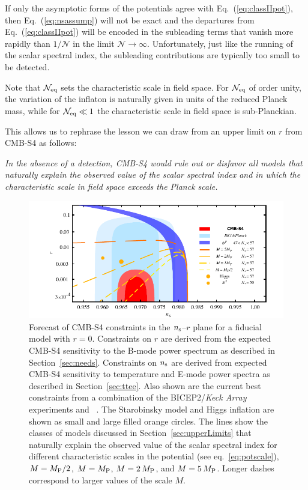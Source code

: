 If only the asymptotic forms of the potentials agree with Eq.~(\ref{eq:classIIpot}), then Eq.~(\ref{eq:nsassump}) will not be exact and the departures from Eq.~(\ref{eq:classIIpot}) will be encoded in the subleading terms that vanish more rapidly than $1/\mathcal{N}$ in the limit $\mathcal{N}\to\infty$. Unfortunately, just like the running of the scalar spectral index, the subleading contributions are typically too small to be detected.

Note that $\mathcal{N}_{\rm eq}$ sets the characteristic scale in field space. For $\mathcal{N}_{\rm eq}$ of order unity, the variation of the inflaton is naturally given in units of the reduced Planck mass, while for $\mathcal{N}_{\rm eq}\ll 1$ the characteristic scale in field space is sub-Planckian. 

This allows us to rephrase the lesson we can draw from an upper limit on $r$ from CMB-S4 as follows:

{\em In the absence of a detection, CMB-S4 would rule out or disfavor all models that naturally explain the observed value of the scalar spectral index and in which the characteristic scale in field space exceeds the Planck scale.}

\begin{figure}[t]
\begin{center}
\includegraphics[width=6in]{Inflation/nsrlabeledr0v8s}
\end{center}
\caption{Forecast of CMB-S4 constraints in the $n_{\rm s}$--$r$ plane for a fiducial model with $r=0$. Constraints 
on $r$ are derived from the expected CMB-S4 sensitivity to the B-mode power spectrum as described in 
Section~\ref{sec:needs}. Constraints on $n_{\rm s}$ are derived from expected CMB-S4 sensitivity to temperature and 
E-mode power spectra as described in Section~\ref{sec:ttee}. Also shown are the current best constraints from a combination of the { BICEP}2/{\em Keck Array} experiments and \planck\ \cite{Array:2015xqh}.  
The Starobinsky model and Higgs inflation are shown as small and large filled orange circles. The lines show the classes of models discussed in Section~\ref{sec:upperLimits} that naturally explain the observed value of the scalar spectral index for different characteristic scales in the potential (see eq.~\eqref{eq:potscale}), $M=M_{\rm P}/2$, $M=M_{\rm P}$, $M=2\,M_{\rm P}$, and $M=5\,M_{\rm P}$. Longer dashes correspond to larger values of the scale $M$. 
}
\label{fig:nsr0}
\end{figure}

